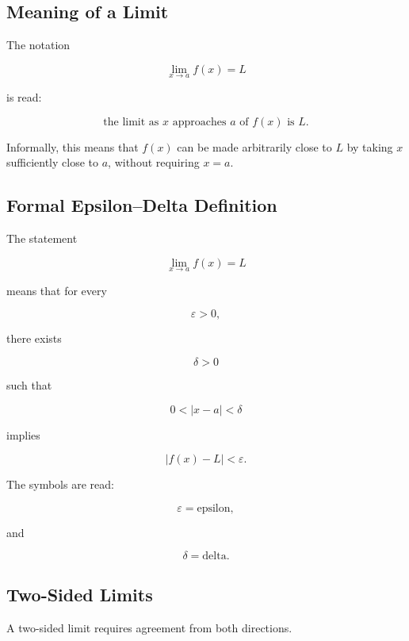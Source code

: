\subsection{Meaning of a Limit}
\label{subsec:meaning-of-limit-reference}

The notation

\[
\boxed{
\lim_{x\to a}f(x)=L
}
\]

is read:

\[
\boxed{
\text{the limit as }x\text{ approaches }a
\text{ of }f(x)\text{ is }L.
}
\]

Informally, this means that \(f(x)\) can be made arbitrarily close to \(L\)
by taking \(x\) sufficiently close to \(a\), without requiring \(x=a\).

\subsection{Formal Epsilon--Delta Definition}
\label{subsec:epsilon-delta-limit-reference}

The statement

\[
\boxed{
\lim_{x\to a}f(x)=L
}
\]

means that for every

\[
\varepsilon>0,
\]

there exists

\[
\delta>0
\]

such that

\[
0<|x-a|<\delta
\]

implies

\[
\boxed{
|f(x)-L|<\varepsilon.
}
\]

The symbols are read:

\[
\varepsilon
=
\text{epsilon},
\]

and

\[
\delta
=
\text{delta}.
\]

\subsection{Two-Sided Limits}
\label{subsec:two-sided-limit-reference}

A two-sided limit requires agreement from both directions.

